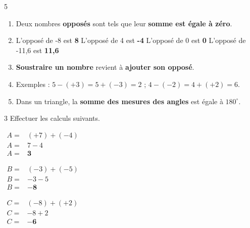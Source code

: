 \documentclass[a4paper]{book}
\begin{document}
{    \begin{exerciceNote}{5}
        \begin{enumerate}[leftmargin=*]
            \item Deux nombres \textbf{opposés} sont tels que leur \textbf{somme est égale à zéro}.
            \item L'opposé de -8 est \textbf{8} \quad L'opposé de 4 est \textbf{-4} \quad L'opposé de 0 est \textbf{0} \quad L'opposé de -11,6 est \textbf{11,6}
            \item \textbf{Soustraire un nombre} revient à \textbf{ajouter son opposé}.
            \item Exemples : $5 - (+3) = 5 + (-3) = 2$ \quad ; \quad $4 - (-2) = 4 + (+2) = 6$.
            \item Dans un triangle, la \textbf{somme des mesures des angles} est égale à $180^\circ$.
        \end{enumerate}    
    \end{exerciceNote}


    \begin{exerciceNote}{3}
        Effectuer les calculs suivants.
        
        \noindent
        \begin{minipage}{0.3\linewidth}
            $\begin{array}{ll}
                A = & (+7) + (-4) \\[1ex]
                A = & 7 - 4 \\[1ex]
                A = & \mathbf{3}
            \end{array}$
        \end{minipage}
        \hfill \vline \hfill
        \begin{minipage}{0.33\linewidth}
            $\begin{array}{ll}
                B = & (-3) + (-5) \\[1ex]
                B = & -3 - 5 \\[1ex]
                B = & \mathbf{-8}
            \end{array}$
        \end{minipage}
        \hfill \vline \hfill
        \begin{minipage}{0.3\linewidth}
            $\begin{array}{ll}
                C = & (-8) + (+2) \\[1ex]
                C = & -8 + 2 \\[1ex]
                C = & \mathbf{-6}
            \end{array}$
        \end{minipage}
        

\end{exerciceNote}}
\end{document}
